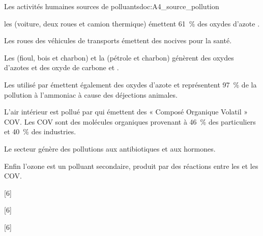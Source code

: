 \begin{doc}{Les activités humaines sources de polluants}{doc:A4_source_pollution}
  \begin{listePoints}
    \item les  (voiture, deux roues et camion thermique) émettent \qty{61}{\percent} des oxydes d'azote .
    \item Les roues des véhicules de transports émettent des  nocives pour la santé.
    \item Les  (fioul, bois et charbon) et la  (pétrole et charbon) génèrent des oxydes d'azotes  et des oxyde de carbone  et \dioxydeDeCarbone.
    \item Les  utilisé par  émettent également des oxydes d'azote  et représentent \qty{97}{\percent} de la pollution à l'ammoniac \ammoniac à cause des déjections animales.
    \item L'air intérieur est pollué par  qui émettent des « Composé Organique Volatil » COV.
    Les COV sont des molécules organiques provenant à \qty{46}{\percent} des particuliers et \qty{40}{\percent} des industries.
    \item Le secteur  génère des pollutions aux antibiotiques et aux hormones.
    \item Enfin l'ozone est un polluant secondaire, produit par des réactions entre les  et les COV.
  \end{listePoints}
\end{doc}

[6]

[6]

[6]

